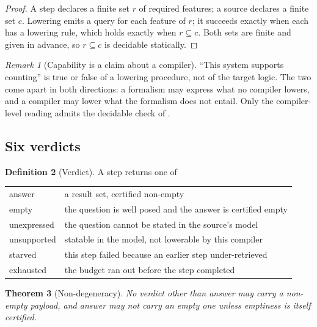 \documentclass[11pt,twocolumn,a4paper]{article}
\theoremstyle{thmstyle}
\newtheorem{theorem}{Theorem}[section]
\theoremstyle{definition}
\newtheorem{definition}[theorem]{Definition}
\theoremstyle{remark}
\newtheorem{remark}[theorem]{Remark}
\newcommand{\vans}{\textsf{answer}}
\newcommand{\vempty}{\textsf{empty}}
\newcommand{\vexp}{\textsf{unexpressed}}
\newcommand{\vsurf}{\textsf{unsupported}}
\newcommand{\vstarve}{\textsf{starved}}
\newcommand{\vhaust}{\textsf{exhausted}}
\begin{document}
\begin{proof}
A step declares a finite set $r$ of required features; a source declares a
finite set $c$. Lowering emits a query for each feature of $r$; it succeeds
exactly when each has a lowering rule, which holds exactly when $r \subseteq
c$. Both sets are finite and given in advance, so $r \subseteq c$ is decidable
statically.
\end{proof}

\begin{remark}[Capability is a claim about a compiler]
\label{rem:capability}
``This system supports counting'' is true or false of a lowering procedure,
not of the target logic. The two come apart in both directions: a formalism
may express what no compiler lowers, and a compiler may lower what the
formalism does not entail. Only the compiler-level reading admits the
decidable check of .
\end{remark}

\subsection{Six verdicts}

\begin{definition}[Verdict]
\label{def:verdict}
A step returns one of
\begin{center}
\begin{tabular}{@{}ll@{}}
\vans & a result set, certified non-empty\\
\vempty & the question is well posed and the answer is certified empty\\
\vexp & the question cannot be stated in the source's model\\
\vsurf & statable in the model, not lowerable by this compiler\\
\vstarve & this step failed because an earlier step under-retrieved\\
\vhaust & the budget ran out before the step completed\\
\end{tabular}
\end{center}
\end{definition}

\begin{theorem}[Non-degeneracy]
\label{thm:nondegeneracy}
No verdict other than \vans{} may carry a non-empty payload, and \vans{} may
not carry an empty one unless emptiness is itself certified.
\end{theorem}
\end{document}
